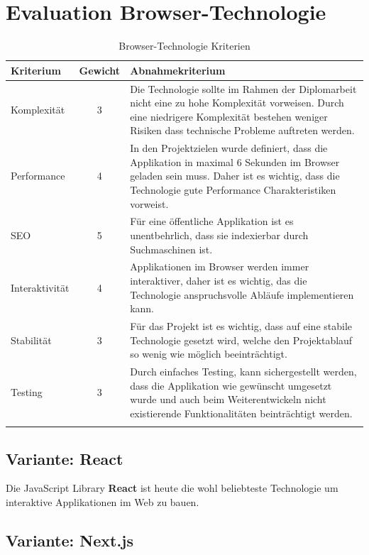 

\clearpage
\section{Evaluation Browser-Technologie}\label{evaluation-browser-technologie}



\begin{longtable}[]{@{}p{2cm}cp{10cm}@{}}
  \toprule
  \textbf{Kriterium} & \textbf{Gewicht} & \textbf{Abnahmekriterium}\tabularnewline
  \midrule
  \endhead
  Komplexität        & 3                & Die Technologie sollte im Rahmen der Diplomarbeit nicht eine zu hohe Komplexität vorweisen. Durch eine niedrigere Komplexität bestehen weniger Risiken dass technische Probleme auftreten werden.\tabularnewline
  \midrule
  Performance        & 4                & In den Projektzielen wurde definiert, dass die Applikation in maximal 6 Sekunden im Browser geladen sein muss. Daher ist es wichtig, dass die Technologie gute Performance Charakteristiken vorweist.\tabularnewline
  \midrule
  SEO                & 5                & Für eine öffentliche Applikation ist es unentbehrlich, dass sie indexierbar durch Suchmaschinen ist.\tabularnewline
  \midrule
  Interaktivität     & 4                & Applikationen im Browser werden immer interaktiver, daher ist es wichtig, das die Technologie anspruchsvolle Abläufe implementieren kann. \tabularnewline
  \midrule
  Stabilität         & 3                & Für das Projekt ist es wichtig, dass auf eine stabile Technologie gesetzt wird, welche den Projektablauf so wenig wie möglich beeinträchtigt. \tabularnewline
  \midrule
  Testing            & 3                & Durch einfaches Testing, kann sichergestellt werden, dass die Applikation wie gewünscht umgesetzt wurde und auch beim Weiterentwickeln nicht existierende Funktionalitäten beinträchtigt werden.\tabularnewline
  \bottomrule
  \caption{Browser-Technologie Kriterien}
\end{longtable}

\subsection{Variante: React}

Die JavaScript Library \textbf{React} ist heute die wohl beliebteste
Technologie um interaktive Applikationen im Web zu bauen.

\subsection{Variante: Next.js}


